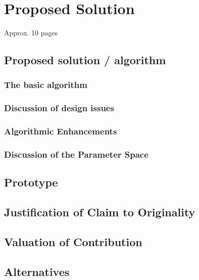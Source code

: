 \chapter{Proposed Solution}
\label{ch:solution}
Approx. 10 pages

\section{Proposed solution / algorithm}

\subsection{The basic algorithm}

\subsection{Discussion of design issues}


\subsection{Algorithmic Enhancements}


\subsection{Discussion of the Parameter Space}


\section{Prototype}

\section{Justification of Claim to Originality}

\section{Valuation of Contribution}

\section{Alternatives}
